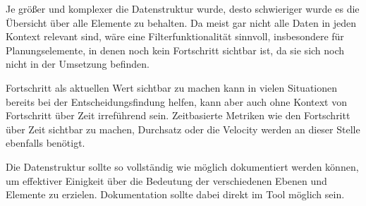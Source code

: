 Je größer und komplexer die Datenstruktur wurde, desto schwieriger wurde es die Übersicht über alle Elemente zu behalten. Da meist gar nicht alle Daten in jeden Kontext relevant sind, wäre eine Filterfunktionalität sinnvoll, insbesondere für Planungselemente, in denen noch kein Fortschritt sichtbar ist, da sie sich noch nicht in der Umsetzung befinden.

Fortschritt als aktuellen Wert sichtbar zu machen kann in vielen Situationen bereits bei der Entscheidungsfindung helfen, kann aber auch ohne Kontext von Fortschritt über Zeit irreführend sein. Zeitbasierte Metriken wie den Fortschritt über Zeit sichtbar zu machen, Durchsatz oder die Velocity werden an dieser Stelle ebenfalls benötigt.

Die Datenstruktur sollte so vollständig wie möglich dokumentiert werden können, um effektiver Einigkeit über die Bedeutung der verschiedenen Ebenen und Elemente zu erzielen. Dokumentation sollte dabei direkt im Tool möglich sein.